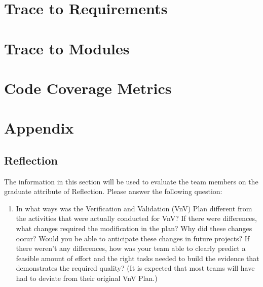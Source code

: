 \documentclass[12pt, titlepage]{article}
\begin{document}
\section{Trace to Requirements}

\section{Trace to Modules}

\section{Code Coverage Metrics}





\newpage{}

\section{Appendix}
\subsection{Reflection}

The information in this section will be used to evaluate the team members on the graduate attribute
of Reflection. Please answer the following question:

\begin{enumerate}
	\item In what ways was the Verification and Validation (VnV) Plan different from the activities that were
	      actually conducted for VnV? If there were differences, what changes required the modification in
	      the plan? Why did these changes occur? Would you be able to anticipate these changes in future
	      projects? If there weren't any differences, how was your team able to clearly predict a feasible
	      amount of effort and the right tasks needed to build the evidence that demonstrates the required
	      quality? (It is expected that most teams will have had to deviate from their original VnV Plan.)
\end{enumerate}
\end{document}
